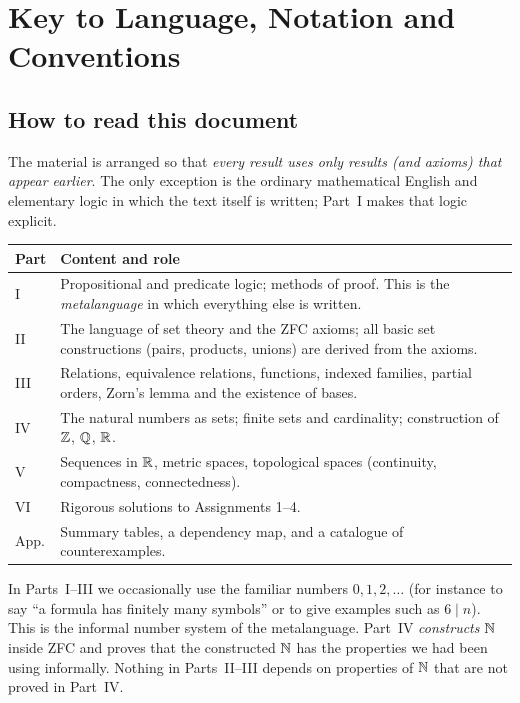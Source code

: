 \chapter*{Key to Language, Notation and Conventions}

\section*{How to read this document}

The material is arranged so that \emph{every result uses only results (and axioms) that appear earlier}. The only exception is the ordinary mathematical English and elementary logic in which the text itself is written; Part~I makes that logic explicit.

\begin{center}
	\begin{tabular}{@{}lp{10.3cm}@{}}
		\toprule
		\textbf{Part} & \textbf{Content and role}\\
		\midrule
		I & Propositional and predicate logic; methods of proof. This is the \emph{metalanguage} in which everything else is written.\\
		II & The language of set theory and the ZFC axioms; all basic set constructions (pairs, products, unions) are derived from the axioms.\\
		III & Relations, equivalence relations, functions, indexed families, partial orders, Zorn's lemma and the existence of bases.\\
		IV & The natural numbers as sets; finite sets and cardinality; construction of $\mathbb{Z}$, $\mathbb{Q}$, $\mathbb{R}$.\\
		V & Sequences in $\mathbb{R}$, metric spaces, topological spaces (continuity, compactness, connectedness).\\
		VI & Rigorous solutions to Assignments 1--4.\\
		App. & Summary tables, a dependency map, and a catalogue of counterexamples.\\
		\bottomrule
	\end{tabular}
\end{center}

\begin{remark}[Bootstrapping]
	In Parts~I--III we occasionally use the familiar numbers $0,1,2,\dots$ (for instance to say ``a formula has finitely many symbols'' or to give examples such as $6\mid n$). This is the informal number system of the metalanguage. Part~IV \emph{constructs} $\mathbb{N}$ inside ZFC and proves that the constructed $\mathbb{N}$ has the properties we had been using informally. Nothing in Parts~II--III depends on properties of $\mathbb{N}$ that are not proved in Part~IV.
\end{remark}

